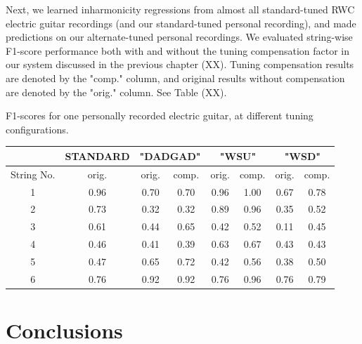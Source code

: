 \documentclass[12pt]{cmuthesis}
\begin{document}
Next, we learned inharmonicity regressions from almost all standard-tuned RWC electric guitar recordings (and our standard-tuned personal recording), and made predictions on our alternate-tuned personal recordings. We evaluated string-wise F1-score performance both with and without the tuning compensation factor in our system discussed in the previous chapter (XX). Tuning compensation results are denoted by the "comp." column, and original results without compensation are denoted by the "orig." column. See Table (XX).

\begin{center}
F1-scores for one personally recorded electric guitar, at different tuning configurations. 
\begin{tabular} {|c||c||c|c||c|c||c|c|}
\hline
& STANDARD & \multicolumn{2}{|c|}{"DADGAD"} & \multicolumn{2}{|c|}{"WSU"} & \multicolumn{2}{|c|}{"WSD"} \\
\hline
String No. & orig. & orig. & comp. & orig. & comp. & orig. & comp. \\
\hline
1 & 0.96 & 0.70 & 0.70 & 0.96 & 1.00 & 0.67 & 0.78 \\
\hline
2 & 0.73 & 0.32 & 0.32 & 0.89 & 0.96 & 0.35 & 0.52\\
\hline
3 & 0.61 & 0.44 & 0.65 & 0.42 & 0.52 & 0.11 & 0.45\\
\hline
4 & 0.46 & 0.41 & 0.39 & 0.63 & 0.67 & 0.43 & 0.43 \\
\hline
5 & 0.47 & 0.65 & 0.72 & 0.42 & 0.56 & 0.38 & 0.50 \\
\hline
6 & 0.76 & 0.92 & 0.92 & 0.76 & 0.96 & 0.76 & 0.79\\ 
\hline
\end{tabular}
\end{center}

\noindent
\chapter{Conclusions}
\section{}
\end{document}
